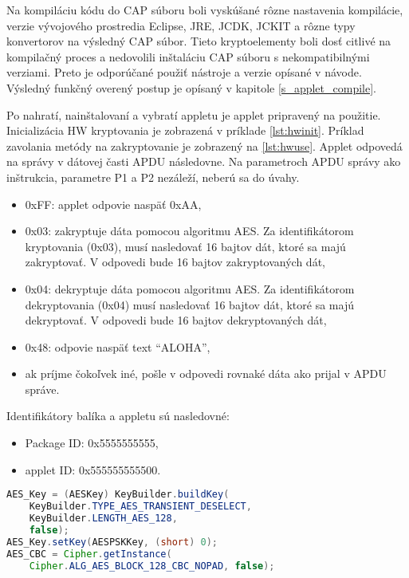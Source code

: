 \documentclass[12pt,a4paper,oneside,openright]{report}
\newcommand{\quotes}[1]{``#1''}
\begin{document}
	Na kompiláciu kódu do CAP súboru boli vyskúšané rôzne nastavenia kompilácie, verzie vývojového prostredia Eclipse, JRE, JCDK, JCKIT a rôzne typy konvertorov na výsledný CAP súbor. Tieto kryptoelementy boli dosť citlivé na kompilačný proces a nedovolili inštaláciu CAP súboru s nekompatibilnými verziami. Preto je odporúčané použiť nástroje a verzie opísané v návode. Výsledný funkčný overený postup je opísaný v kapitole \ref{s_applet_compile}.
	
	Po nahratí, nainštalovaní a vybratí appletu je applet pripravený na použitie. Inicializácia HW kryptovania je zobrazená v príklade \ref{lst:hwinit}. Príklad zavolania metódy na zakryptovanie je zobrazený na \ref{lst:hwuse}.  Applet odpovedá na správy v dátovej časti APDU následovne. Na parametroch APDU správy ako inštrukcia, parametre P1 a P2 nezáleží, neberú sa do úvahy.
	\begin{itemize}
		\item 0xFF: applet odpovie naspäť 0xAA,
		\item 0x03: zakryptuje dáta pomocou algoritmu AES. Za identifikátorom kryptovania (0x03), musí nasledovať 16 bajtov dát, ktoré sa majú zakryptovať. V odpovedi bude 16 bajtov zakryptovaných dát,
		\item 0x04: dekryptuje dáta pomocou algoritmu AES. Za identifikátorom dekryptovania (0x04) musí nasledovať 16 bajtov dát, ktoré sa majú dekryptovať. V odpovedi bude 16 bajtov dekryptovaných dát,
		\item 0x48: odpovie naspäť text \quotes{ALOHA},
		\item ak príjme čokoľvek iné, pošle v odpovedi rovnaké dáta ako prijal v APDU správe.
	\end{itemize}
		\onehalfspacing
		
	Identifikátory balíka a appletu sú nasledovné:
	\singlespacing
	\begin{itemize}
		\item Package ID: \tabto{2.5cm}0x5555555555,		
		\item applet ID: \tabto{2.5cm}0x555555555500.
	\end{itemize}
		\onehalfspacing
	
	\begin{lstlisting}[caption={Inicializácia HW AES.}, label={lst:hwinit}, language=java] 
AES_Key = (AESKey) KeyBuilder.buildKey(
	KeyBuilder.TYPE_AES_TRANSIENT_DESELECT,
	KeyBuilder.LENGTH_AES_128,
	false);
AES_Key.setKey(AESPSKKey, (short) 0);
AES_CBC = Cipher.getInstance(
	Cipher.ALG_AES_BLOCK_128_CBC_NOPAD, false);
		\end{lstlisting}
	
\end{document}
